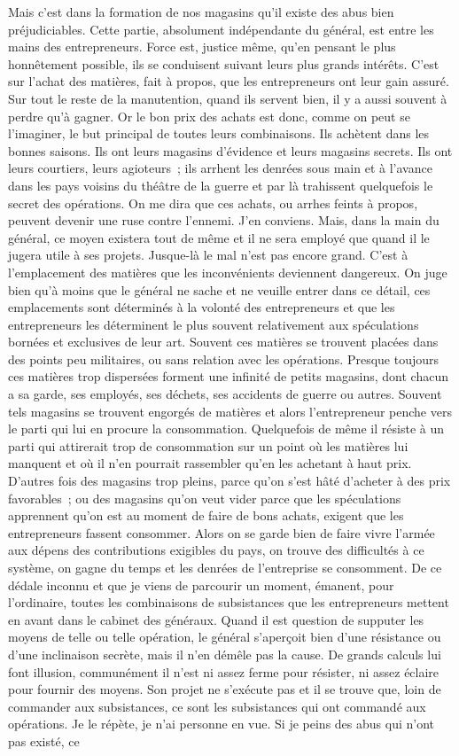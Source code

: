 \documentclass[french,twoside]{book} %
\begin{document}
Mais c’est dans la formation de nos magasins qu’il existe des abus bien préjudiciables. Cette partie, absolument indépendante du général, est entre les mains des entrepreneurs. Force est, justice même, qu’en pensant le plus honnêtement possible, ils se conduisent suivant leurs plus grands intérêts. C’est sur l’achat des matières, fait à propos, que les entrepreneurs ont leur gain assuré. Sur tout le reste de la manutention, quand ils servent bien, il y a aussi souvent à perdre qu’à gagner. Or le bon prix des achats est donc, comme on peut se l’imaginer, le but principal de toutes leurs combinaisons. Ils achètent dans les bonnes saisons. Ils ont leurs magasins d’évidence et leurs magasins secrets. Ils ont leurs courtiers, leurs agioteurs ; ils arrhent les denrées sous main et à l’avance dans les pays voisins du théâtre de la guerre et par là trahissent quelquefois le secret des opérations. On me dira que ces achats, ou arrhes feints à propos, peuvent devenir une ruse contre l’ennemi. J’en conviens. Mais, dans la main du général, ce moyen existera tout de même et il ne sera employé que quand il le jugera utile à ses projets. Jusque-là le mal n’est pas encore grand. C’est à l’emplacement des matières que les inconvénients deviennent dangereux. On juge bien qu’à moins que le général ne sache et ne veuille entrer dans ce détail, ces emplacements sont déterminés à la volonté des entrepreneurs et que les entrepreneurs les déterminent le plus souvent relativement aux spéculations bornées et exclusives de leur art. Souvent ces matières se trouvent placées dans des points peu militaires, ou sans relation avec les opérations. Presque toujours ces matières trop dispersées forment une infinité de petits magasins, dont chacun a sa garde, ses employés, ses déchets, ses accidents de guerre ou autres. Souvent tels magasins se trouvent engorgés de matières et alors l’entrepreneur penche vers le parti qui lui en procure la consommation. Quelquefois de même il résiste à un parti qui attirerait trop de consommation sur un point où les matières lui manquent et où il n’en pourrait rassembler qu’en les achetant à haut prix. D’autres fois des magasins trop pleins, parce qu’on s’est hâté d’acheter à des prix favorables ; ou des magasins qu’on veut vider parce que les spéculations apprennent qu’on est au moment de faire de bons achats, exigent que les entrepreneurs fassent consommer. Alors on se garde bien de faire vivre l’armée aux dépens des contributions exigibles du pays, on trouve des difficultés à ce système, on gagne du temps et les denrées de l’entreprise se consomment. De ce dédale inconnu et que je viens de parcourir un moment, émanent, pour l’ordinaire, toutes les combinaisons de subsistances que les entrepreneurs mettent en avant dans le cabinet des généraux. Quand il est question de supputer les moyens de telle ou telle opération, le général s’aperçoit bien d’une résistance ou d’une inclinaison secrète, mais il n’en démêle pas la cause. De grands calculs lui font illusion, communément il n’est ni assez ferme pour résister, ni assez éclaire pour fournir des moyens. Son projet ne s’exécute pas et il se trouve que, loin de commander aux subsistances, ce sont les subsistances qui ont commandé aux opérations. Je le répète, je n’ai personne en vue. Si je peins des abus qui n’ont pas existé, ce 
\end{document}
